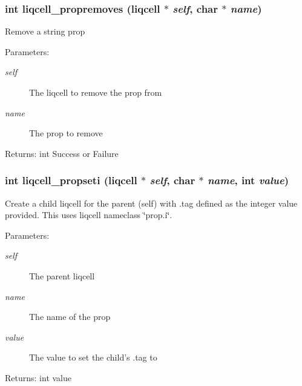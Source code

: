 \subsubsection[{liqcell\_\-propremoves}]{\setlength{\rightskip}{0pt plus 5cm}int liqcell\_\-propremoves (liqcell $\ast$ {\em self}, \/  char $\ast$ {\em name})}\label{d7/db4/liqcell__prop_8c_f2fcef990511d5410f99d33e3e490837}


Remove a string prop \begin{Desc}
\item[Parameters:]
\begin{description}
\item[{\em self}]The liqcell to remove the prop from \item[{\em name}]The prop to remove \end{description}
\end{Desc}
\begin{Desc}
\item[Returns:]int Success or Failure \end{Desc}
\subsubsection[{liqcell\_\-propseti}]{\setlength{\rightskip}{0pt plus 5cm}int liqcell\_\-propseti (liqcell $\ast$ {\em self}, \/  char $\ast$ {\em name}, \/  int {\em value})}\label{d7/db4/liqcell__prop_8c_84d505dda856299bc51da9d0871ca7b2}


Create a child liqcell for the parent (self) with .tag defined as the integer value provided. This uses liqcell nameclass \char`\"{}prop.i\char`\"{}.

\begin{Desc}
\item[Parameters:]
\begin{description}
\item[{\em self}]The parent liqcell \item[{\em name}]The name of the prop \item[{\em value}]The value to set the child's .tag to \end{description}
\end{Desc}
\begin{Desc}
\item[Returns:]int value \end{Desc}


